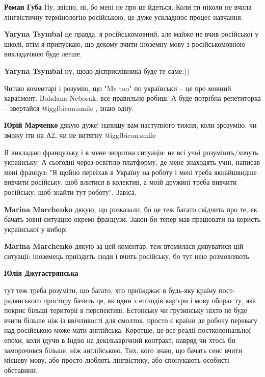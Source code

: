 \begin{itemize}
\begin{itemize}
\textbf{Роман Губа} Ну, звісно, ні, бо мені не про це йдеться. Коли ти ніколи не вчила лінгвістичну термінологію російською, це дуже ускладнює процес навчання.

\textbf{Yaryna Tsymbal} це правда. я російськомовний, але майже не вчив російської у школі, втім я припускаю, що декому вчити іноземну мову з російськомовною викладачкою буде легше.

\textbf{Yaryna Tsymbal} ну, щодо дієприслівника буде те саме:))
\end{itemize} %


Читаю коментарі і розумію, що "Me too" по українськи – це про мовний харасмент.
Bohdana Neborak, все правильно робиш. А буде потрібна репетиторка – звертайся
 @igg{fbicon.smile} , знаю одну.

 \begin{itemize} %
\textbf{Юрій Марченко} дякую дуже! напишу вам наступного тижня, коли зрозумію, чи зможу іти на А2, чи не витягну  @igg{fbicon.smile}  
 \end{itemize} %


Я викладаю французьку і в мене зворотна ситуація: не всі учні розуміють/хочуть
українську. А сьогодні через освітню платформу, де мене знаходять учні, написав
мені француз: "Я щойно переїхав в Україну на роботу і мені треба якнайшвидше
вивчити російську, щоб влитися в колектив, а моїй дружині треба вивчити
російську, щоб знайти тут роботу". Завіса.

\begin{itemize} %
\textbf{Marina Marchenko} дякую, що розказали, бо це теж багато свідчить про те, як бачать зовні ситуацію окремі французи. Закон би тепер мав працювати на користь української у виборі

\textbf{Marina Marchenko} дякую за цей коментар, теж втомилася дивуватися цій ситуації: іноземець приїздить сюди і вчить російську, бо тут нею розмовляють.

\textbf{Юлія Джугастрянська} 

тут теж треба розуміти, що багато, хто приїжджає в будь-яку країну
пост-радянського простору бачить це, як один з епізодів кар‘єри і мову обирає
ту, яка покриє більші території в перспективі. Естонську чи грузинську ніхто не
буде вчити більше ніж із ввічливості для смолток, просто є країни де робочу
перевагу над російською може мати англійська. Коротше, це все реалії
постколоніальної епохи, коли їдучи в Індію на декількарічний контракт, навряд
чи хтось би заморочився більше, ніж англійською. Тих, кого знаю, що бачать сенс
вчити місцеву мову, або просто люблять лінгвістику, або спонукають особисті
обставини.


\end{itemize}
\end{itemize}
